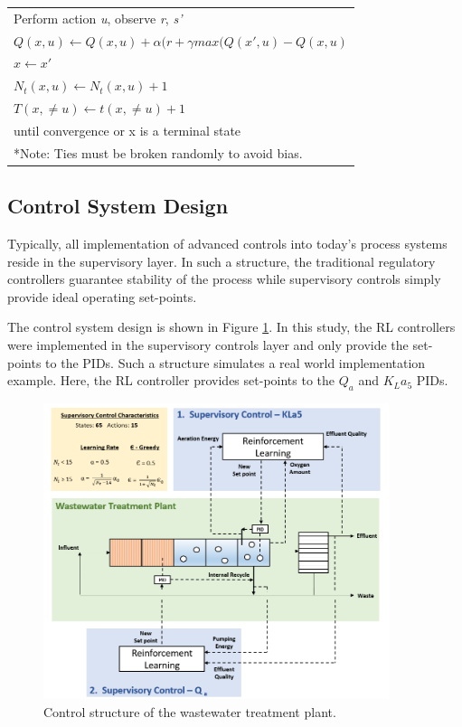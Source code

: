 \begin{table}[h]
\begin{tabular}{p{15cm}}
		\hspace{2cm} Perform action \emph{u}, observe \emph{r}, \emph{s'} \\
		\hspace{2cm} $Q(x, u) \leftarrow Q(x, u) + \alpha(r + \gamma max(Q(x', u) - Q(x, u)$ \\
		\hspace{2cm} $x \leftarrow x'$ \\
		\hspace{2cm} $N_t(x, u) \leftarrow N_t(x, u) + 1$ \\
		\hspace{2cm} $T(x, \neq u) \leftarrow t(x, \neq u) + 1$ \\
		\hspace{1cm} until convergence or x is a terminal state \\ \hline
		*Note: Ties must be broken randomly to avoid bias.
	\end{tabular}
\end{table}

\subsection{Control System Design}
Typically, all implementation of advanced controls into today's process systems reside in the supervisory layer. In such a structure, the traditional regulatory controllers guarantee stability of the process while supervisory controls simply provide ideal operating set-points.

The control system design is shown in Figure \ref{fig:04wwtp_rl}. In this study, the RL controllers were implemented in the supervisory controls layer and only provide the set-points to the PIDs. Such a structure simulates a real world implementation example. Here, the RL controller provides set-points to the $Q_a$ and $K_La_5$ PIDs.

\begin{figure}[H]
    \centering
    \includegraphics[width=0.9\textwidth]{images/ch4/supervisory_control.png}
    \caption{Control structure of the wastewater treatment plant.}
    \label{fig:04wwtp_rl}
\end{figure}


